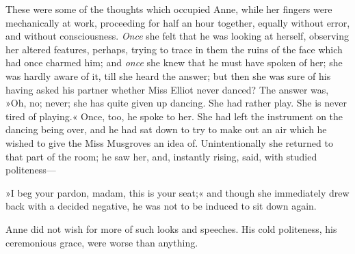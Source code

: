 These were some of the thoughts which occupied Anne, while her fingers were mechanically at work, proceeding for half an hour together, equally without error, and without consciousness. \textit{Once} she felt that he was looking at herself, observing her altered features, perhaps, trying to trace in them the ruins of the face which had once charmed him; and \textit{once} she knew that he must have spoken of her; she was hardly aware of it, till she heard the answer; but then she was sure of his having asked his partner whether Miss Elliot never danced? The answer was, »Oh, no; never; she has quite given up dancing. She had rather play. She is never tired of playing.« Once, too, he spoke to her. She had left the instrument on the dancing being over, and he had sat down to try to make out an air which he wished to give the Miss Musgroves an idea of. Unintentionally she returned to that part of the room; he saw her, and, instantly rising, said, with studied politeness—

»I beg your pardon, madam, this is your seat;« and though she immediately drew back with a decided negative, he was not to be induced to sit down again.

Anne did not wish for more of such looks and speeches. His cold politeness, his ceremonious grace, were worse than anything.